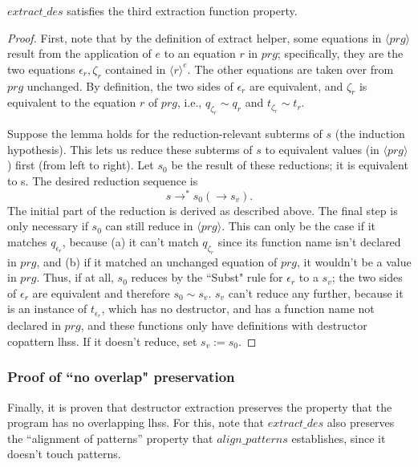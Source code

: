 \begin{lemma}

$extract\_des$ satisfies the third extraction function property.

\begin{proof}

First, note that by the definition of extract helper, some equations in $\langle prg \rangle$ result from the application of $e$ to an equation $r$ in $prg$; specifically, they are the two equations $\epsilon_r, \zeta_r$ contained in $\langle r \rangle^e$. The other equations are taken over from $prg$ unchanged. By definition, the two sides of $\epsilon_r$ are equivalent, and $\zeta_r$ is equivalent to the equation $r$ of $prg$, i.e., $q_{\zeta_r} \sim q_r$ and $t_{\zeta_r} \sim t_r$.

Suppose the lemma holds for the reduction-relevant subterms of $s$ (the induction hypothesis). This lets us reduce these subterms of $s$ to equivalent values (in $\langle prg \rangle$) first (from left to right). Let $s_0$ be the result of these reductions; it is equivalent to s. The desired reduction sequence is
\begin{equation*}
s \longrightarrow^* s_0 (\longrightarrow s_v).
\end{equation*}
The initial part of the reduction is derived as described above. The final step is only necessary if $s_0$ can still reduce in $\langle prg \rangle$. This can only be the case if it matches $q_{\epsilon_r}$, because (a) it can't match $q_{\zeta_r}$ since its function name isn't declared in $prg$, and (b) if it matched an unchanged equation of $prg$, it wouldn't be a value in $prg$. Thus, if at all, $s_0$ reduces by the ``Subst" rule for $\epsilon_r$ to a $s_v$; the two sides of $\epsilon_r$ are equivalent and therefore $s_0 \sim s_v$. $s_v$ can't reduce any further, because it is an instance of $t_{\epsilon_r}$, which has no destructor, and has a function name not declared in $prg$, and these functions only have definitions with destructor copattern lhss. If it doesn't reduce, set $s_v := s_0$.

\end{proof}

\end{lemma}

\subsubsection{Proof of ``no overlap" preservation}

Finally, it is proven that destructor extraction preserves the property that the program has no overlapping lhss. For this, note that $extract\_des$ also preserves the ``alignment of patterns'' property that $align\_patterns$ establishes, since it doesn't touch patterns.


